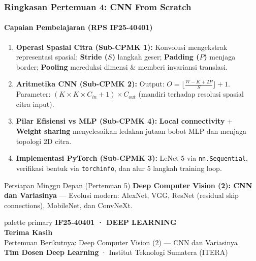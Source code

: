 \documentclass[t,aspectratio=169,xcolor=dvipsnames]{beamer}
\begin{document}
\begin{frame}
    \frametitle{Ringkasan Pertemuan 4: CNN From Scratch}
    \framesubtitle{Capaian Pembelajaran (RPS IF25-40401)}
    \footnotesize

    \begin{enumerate}
        \item \textbf{Operasi Spasial Citra (Sub-CPMK 1):} Konvolusi mengekstrak representasi spasial; \textbf{Stride ($S$)} langkah geser; \textbf{Padding ($P$)} menjaga border; \textbf{Pooling} mereduksi dimensi \& memberi invariansi translasi.
        \item \textbf{Aritmetika CNN (Sub-CPMK 2):} Output: $O = \lfloor\frac{W - K + 2P}{S}\rfloor + 1$. Parameter: $(K \times K \times C_{in} + 1) \times C_{out}$ (mandiri terhadap resolusi spasial citra input).
        \item \textbf{Pilar Efisiensi vs MLP (Sub-CPMK 4):} \textbf{Local connectivity} + \textbf{Weight sharing} menyelesaikan ledakan jutaan bobot MLP dan menjaga topologi 2D citra.
        \item \textbf{Implementasi PyTorch (Sub-CPMK 3):} LeNet-5 via \texttt{nn.Sequential}, verifikasi bentuk via \texttt{torchinfo}, dan alur 5 langkah training loop.
    \end{enumerate}

    \begin{block}{Persiapan Minggu Depan (Pertemuan 5)}
        \textbf{Deep Computer Vision (2): CNN dan Variasinya} --- Evolusi modern: AlexNet, VGG, ResNet (residual skip connections), MobileNet, dan ConvNeXt.
    \end{block}
\end{frame}

\begin{frame}[plain]
  \begin{beamercolorbox}[wd=\paperwidth,ht=\paperheight,sep=1.5cm]{palette primary}
    \vspace{1.5cm}
    {\scriptsize\bfseries\color{dlMute}IF25-40401 · DEEP LEARNING}\\[0.4cm]
    {\Huge\bfseries Terima Kasih}\\[0.4cm]
    {\small Pertemuan Berikutnya: Deep Computer Vision (2) --- CNN dan Variasinya}\\[1.0cm]
    \vfill
    {\scriptsize\textbf{Tim Dosen Deep Learning} · Institut Teknologi Sumatera (ITERA)}
  \end{beamercolorbox}
\end{frame}

\end{document}

